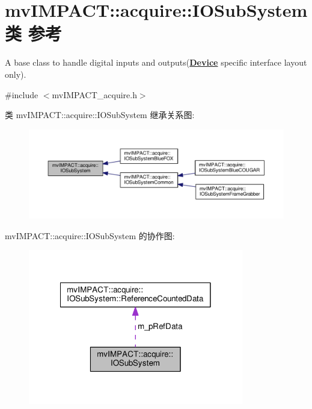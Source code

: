 \hypertarget{classmv_i_m_p_a_c_t_1_1acquire_1_1_i_o_sub_system}{\section{mv\+I\+M\+P\+A\+C\+T\+:\+:acquire\+:\+:I\+O\+Sub\+System类 参考}
\label{classmv_i_m_p_a_c_t_1_1acquire_1_1_i_o_sub_system}
}


A base class to handle digital inputs and outputs({\bfseries \hyperlink{classmv_i_m_p_a_c_t_1_1acquire_1_1_device}{Device}} specific interface layout only).  




{\ttfamily \#include $<$mv\+I\+M\+P\+A\+C\+T\+\_\+acquire.\+h$>$}



类 mv\+I\+M\+P\+A\+C\+T\+:\+:acquire\+:\+:I\+O\+Sub\+System 继承关系图\+:
\nopagebreak
\begin{figure}[H]
\begin{center}
\leavevmode
\includegraphics[width=350pt]{classmv_i_m_p_a_c_t_1_1acquire_1_1_i_o_sub_system__inherit__graph}
\end{center}
\end{figure}


mv\+I\+M\+P\+A\+C\+T\+:\+:acquire\+:\+:I\+O\+Sub\+System 的协作图\+:
\nopagebreak
\begin{figure}[H]
\begin{center}
\leavevmode
\includegraphics[width=266pt]{classmv_i_m_p_a_c_t_1_1acquire_1_1_i_o_sub_system__coll__graph}
\end{center}
\end{figure}
